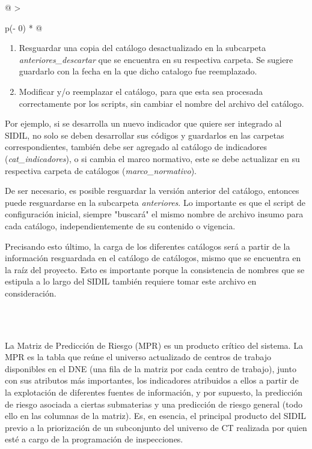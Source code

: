 \documentclass[
]{article}
\begin{document}
\begin{longtable}[]{@{}
  >{\raggedright\arraybackslash}p{(\columnwidth - 0\tabcolsep) * }@{}}
\begin{minipage}[b]{\linewidth}
\begin{enumerate}
\def\labelenumi{\arabic{enumi})}
\item
  Resguardar una copia del catálogo desactualizado en la subcarpeta \emph{anteriores\_descartar} que se encuentra en su respectiva carpeta. Se sugiere guardarlo con la fecha en la que dicho catalogo fue reemplazado.
\item
  Modificar y/o reemplazar el catálogo, para que esta sea procesada correctamente por los scripts, sin cambiar el nombre del archivo del catálogo.
\end{enumerate}

Por ejemplo, si se desarrolla un nuevo indicador que quiere ser integrado al SIDIL, no solo se deben desarrollar sus códigos y guardarlos en las carpetas correspondientes, también debe ser agregado al catálogo de indicadores (\emph{cat\_indicadores}), o si cambia el marco normativo, este se debe actualizar en su respectiva carpeta de catálogos (\emph{marco\_normativo}).

De ser necesario, es posible resguardar la versión anterior del catálogo, entonces puede resguardarse en la subcarpeta \emph{anteriores}. Lo importante es que el script de configuración inicial, siempre "buscará" el mismo nombre de archivo insumo para cada catálogo, independientemente de su contenido o vigencia.

Precisando esto último, la carga de los diferentes catálogos será a partir de la información resguardada en el catálogo de catálogos, mismo que se encuentra en la raíz del proyecto. Esto es importante porque la consistencia de nombres que se estipula a lo largo del SIDIL también requiere tomar este archivo en consideración.
\end{minipage} \\
\midrule\noalign{}
\endhead
\bottomrule\noalign{}
\endlastfoot
 \\
\end{longtable}

La Matriz de Predicción de Riesgo (MPR) es un producto crítico del sistema. La MPR es la tabla que reúne el universo actualizado de centros de trabajo disponibles en el DNE (una fila de la matriz por cada centro de trabajo), junto con sus atributos más importantes, los indicadores atribuidos a ellos a partir de la explotación de diferentes fuentes de información, y por supuesto, la predicción de riesgo asociada a ciertas submaterias y una predicción de riesgo general (todo ello en las columnas de la matriz). Es, en esencia, el principal producto del SIDIL previo a la priorización de un subconjunto del universo de CT realizada por quien esté a cargo de la programación de inspecciones.
\end{document}
